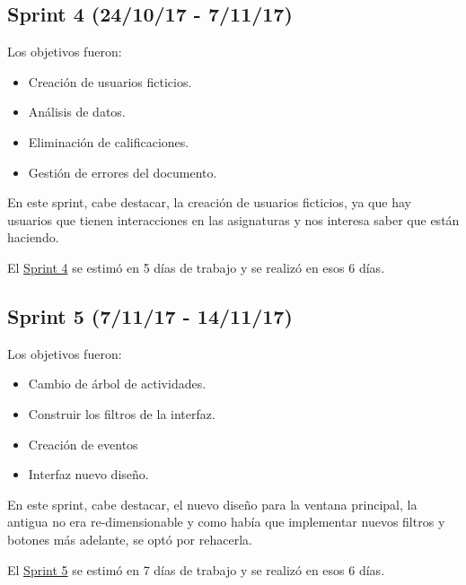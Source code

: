 
\subsection{Sprint 4 (24/10/17 -
	7/11/17)}\label{sprint-4-241017---071117}

Los objetivos fueron:
\begin{itemize}
	\tightlist
	\item
	Creación de usuarios ficticios.
	\item
	Análisis de datos.
	\item
	Eliminación de calificaciones.	
	\item
	Gestión de errores del documento.
	
\end{itemize}

En este sprint, cabe destacar, la creación de usuarios ficticios, ya que hay usuarios que tienen interacciones en las asignaturas y nos interesa saber que están haciendo.

El \href{https://github.com/trona85/GII-17.1B-UBULog-1.0/milestone/4?closed=1}{Sprint 4} se estimó en 5 días de trabajo y se realizó en esos 6 días.


\subsection{Sprint 5 (7/11/17 -
	14/11/17)}\label{sprint-5-071117---141117}

Los objetivos fueron:
\begin{itemize}
	\tightlist
	\item
	Cambio de árbol de actividades.
	\item
	Construir los filtros de la interfaz.
	\item
	Creación de eventos	
	\item
	Interfaz nuevo diseño.
	
\end{itemize}

En este sprint, cabe destacar, el nuevo diseño para la ventana principal, la antigua no era re-dimensionable y como había que implementar nuevos filtros y botones más adelante, se optó por rehacerla.

El \href{https://github.com/trona85/GII-17.1B-UBULog-1.0/milestone/5?closed=1}{Sprint 5} se estimó en 7 días de trabajo y se realizó en esos 6 días.


